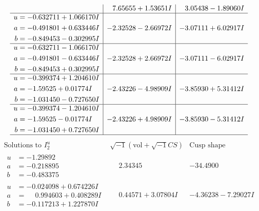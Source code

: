 \documentclass[1p]{elsarticle_modified}
\theoremstyle{definition}
\newcommand{\I}{\sqrt{-1}}
\begin{document}
$$\begin{array}{c|c|c}
 & \phantom{-}7.65655 + 1.53651 I & \phantom{-}3.05438 - 1.89060 I \\ \hline\begin{aligned}
u &= -0.632711 + 1.066170 I \\
a &= -0.491801 + 0.633446 I \\
b &= -0.849453 - 0.302995 I\end{aligned}
 & -2.32528 - 2.66972 I & -3.07111 + 6.02917 I \\ \hline\begin{aligned}
u &= -0.632711 - 1.066170 I \\
a &= -0.491801 - 0.633446 I \\
b &= -0.849453 + 0.302995 I\end{aligned}
 & -2.32528 + 2.66972 I & -3.07111 - 6.02917 I \\ \hline\begin{aligned}
u &= -0.399374 + 1.204610 I \\
a &= -1.59525 + 0.01774 I \\
b &= -1.031450 - 0.727650 I\end{aligned}
 & -2.43226 - 4.98909 I & -3.85930 + 5.31412 I \\ \hline\begin{aligned}
u &= -0.399374 - 1.204610 I \\
a &= -1.59525 - 0.01774 I \\
b &= -1.031450 + 0.727650 I\end{aligned}
 & -2.43226 + 4.98909 I & -3.85930 - 5.31412 I\\
 \hline 
 \end{array}$$\newpage$$\begin{array}{c|c|c}  
\text{Solutions to }I^u_{2}& \I (\text{vol} + \sqrt{-1}CS) & \text{Cusp shape}\\
 \hline 
\begin{aligned}
u &= -1.29892\phantom{ +0.000000I} \\
a &= -0.218895\phantom{ +0.000000I} \\
b &= -0.483375\phantom{ +0.000000I}\end{aligned}
 & \phantom{-}2.34345\phantom{ +0.000000I} & -34.4900\phantom{ +0.000000I} \\ \hline\begin{aligned}
u &= -0.024098 + 0.674226 I \\
a &= \phantom{-}0.994603 + 0.408289 I \\
b &= -0.117213 + 1.227870 I\end{aligned}
 & \phantom{-}0.44571 + 3.07804 I & -4.36238 - 7.29027 I \\ \hline\begin{aligned}

\end{aligned}
\end{array}$$
\end{document}

